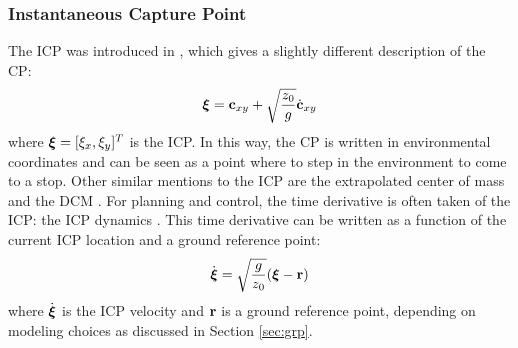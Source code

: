 \subsubsection{Instantaneous Capture Point} 
The \ac{ICP} was introduced in \cite{koolen2012capturability}, which gives a slightly different description of the \ac{CP}:
\begin{equation}
\boldsymbol{\xi}=\mathbf{c}_{xy}+\sqrt{\frac{z_0}{g}}\dot{\mathbf{c}}_{xy} 
\label{eq:icp}
\end{equation}
where $\boldsymbol{\xi}=[\xi_x, \xi_y]^T$ is the \ac{ICP}. In this way, the \ac{CP} is written in environmental coordinates and can be seen as a point where to step in the environment to come to a stop. Other similar mentions to the \ac{ICP} are the extrapolated center of mass \cite{hof2008extrapolated} and the \ac{DCM} \cite{takenaka2009real}. 
\paraskip
For planning and control, the time derivative is often taken of the \ac{ICP}: the \ac{ICP} dynamics \cite{koolen2012capturability}. This time derivative can be written as a function of the current \ac{ICP} location and a ground reference point:
\begin{equation}\label{eq:icpdyn}
\dot{\boldsymbol{\xi}}=\sqrt{ \frac{g}{z_0}}(\boldsymbol{\xi}-\mathbf{r})
\end{equation}
where $\dot{\boldsymbol{\xi}}$ is the \ac{ICP} velocity and $\mathbf{r}$ is a ground reference point, depending on modeling choices as discussed in Section \ref{sec:grp}.


